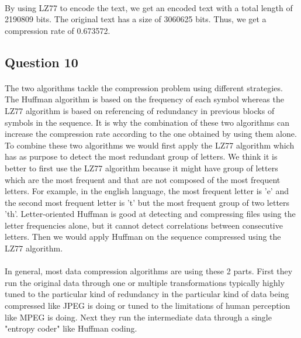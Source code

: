 \documentclass[a4paper, 11pt, oneside]{article}
\begin{document}
\paragraph{}By using LZ77 to encode the text, we get an encoded text with a total length of 2190809 bits.
The original text has a size of 3060625 bits. Thus, we get a compression rate of 0.673572.


\subsection{Question 10}
\paragraph{}The two algorithms tackle the compression problem using different strategies. The Huffman 
algorithm is based on the frequency of each symbol whereas the LZ77 algorithm is based on referencing of 
redundancy in previous blocks of symbols in the sequence. It is why the combination of these two algorithms can increase the compression rate according to the one obtained by using them alone.
To combine these two algorithms we would first apply the LZ77 algorithm which has as purpose to detect the most redundant group of letters. We think it is better to first
use the LZ77 algorithm because it might have group of letters which are the most frequent and that are not composed of the most frequent letters. For example, in the english language, the 
most frequent letter is 'e' and the second most frequent letter is 't' but the most frequent group of two letters 'th'. Letter-oriented Huffman is good at detecting and compressing files using the letter frequencies alone, but it cannot detect correlations between consecutive letters.
Then we would apply Huffman on the sequence compressed using the LZ77 algorithm. 

\paragraph{}In general, most data compression algorithms are using these 2 parts. First they run the original data through one or multiple transformations typically highly tuned to the particular kind of redundancy in the particular kind of data being compressed like JPEG is doing or tuned to the limitations of human perception like MPEG is doing. Next they run the intermediate data through a single "entropy coder" like Huffman coding.
\end{document}
